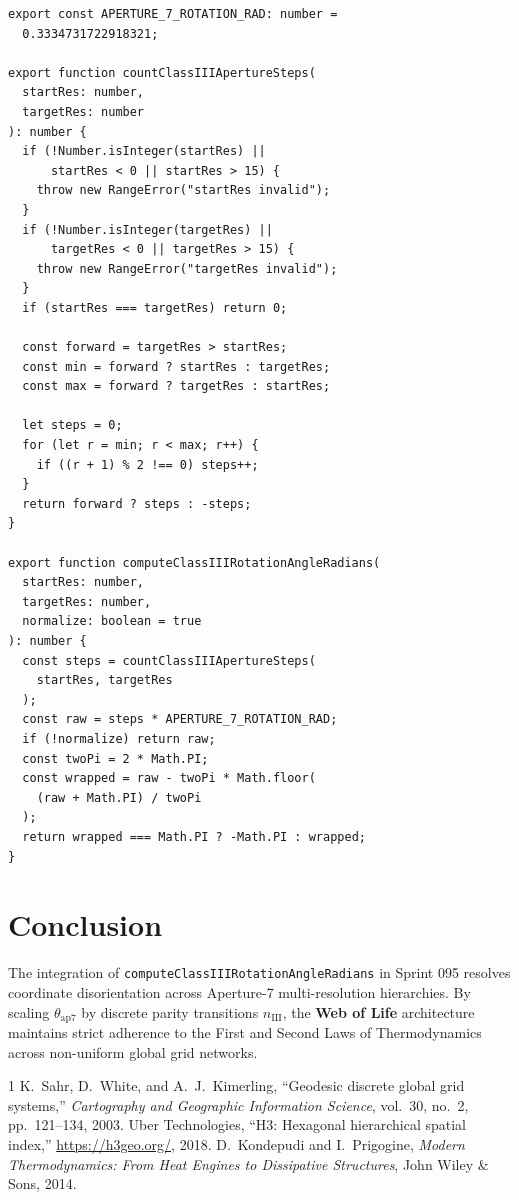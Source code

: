 \documentclass[10pt,journal,compsoc]{IEEEtran}
\begin{document}
\begin{verbatim}
export const APERTURE_7_ROTATION_RAD: number = 
  0.3334731722918321;

export function countClassIIIApertureSteps(
  startRes: number, 
  targetRes: number
): number {
  if (!Number.isInteger(startRes) || 
      startRes < 0 || startRes > 15) {
    throw new RangeError("startRes invalid");
  }
  if (!Number.isInteger(targetRes) || 
      targetRes < 0 || targetRes > 15) {
    throw new RangeError("targetRes invalid");
  }
  if (startRes === targetRes) return 0;
  
  const forward = targetRes > startRes;
  const min = forward ? startRes : targetRes;
  const max = forward ? targetRes : startRes;
  
  let steps = 0;
  for (let r = min; r < max; r++) {
    if ((r + 1) % 2 !== 0) steps++;
  }
  return forward ? steps : -steps;
}

export function computeClassIIIRotationAngleRadians(
  startRes: number,
  targetRes: number,
  normalize: boolean = true
): number {
  const steps = countClassIIIApertureSteps(
    startRes, targetRes
  );
  const raw = steps * APERTURE_7_ROTATION_RAD;
  if (!normalize) return raw;
  const twoPi = 2 * Math.PI;
  const wrapped = raw - twoPi * Math.floor(
    (raw + Math.PI) / twoPi
  );
  return wrapped === Math.PI ? -Math.PI : wrapped;
}
\end{verbatim}

\section{Conclusion}
The integration of \texttt{computeClassIIIRotationAngleRadians} in Sprint 095 resolves coordinate disorientation across Aperture-7 multi-resolution hierarchies. By scaling $\theta_{\text{ap7}}$ by discrete parity transitions $n_{\text{III}}$, the \textbf{Web of Life} architecture maintains strict adherence to the First and Second Laws of Thermodynamics across non-uniform global grid networks.


\begin{thebibliography}{1}
K.~Sahr, D.~White, and A.~J.~Kimerling, ``Geodesic discrete global grid systems,'' \emph{Cartography and Geographic Information Science}, vol.~30, no.~2, pp.~121--134, 2003.
Uber Technologies, ``H3: Hexagonal hierarchical spatial index,'' \url{https://h3geo.org/}, 2018.
D.~Kondepudi and I.~Prigogine, \emph{Modern Thermodynamics: From Heat Engines to Dissipative Structures}, John Wiley \& Sons, 2014.
\end{thebibliography}
\end{document}
